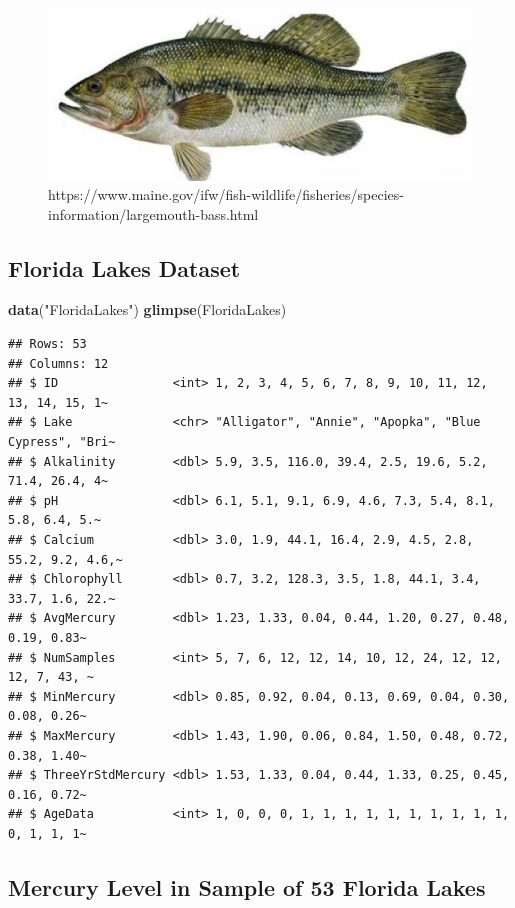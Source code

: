 \documentclass[]{book}
\newenvironment{Shaded}{\begin{snugshade}}{\end{snugshade}}
\newcommand{\KeywordTok}[1]{\textcolor[rgb]{0.13,0.29,0.53}{\textbf{#1}}}
\newcommand{\StringTok}[1]{\textcolor[rgb]{0.31,0.60,0.02}{#1}}
\newcommand{\NormalTok}[1]{#1}
\begin{document}
\begin{figure}
\includegraphics[width=0.5\linewidth]{Bass} \caption{https://www.maine.gov/ifw/fish-wildlife/fisheries/species-information/largemouth-bass.html}\label{fig:Bass}
\end{figure}

\subsection{Florida Lakes Dataset}\label{florida-lakes-dataset}

\begin{Shaded}
\begin{Highlighting}[]
\KeywordTok{data}\NormalTok{(}\StringTok{"FloridaLakes"}\NormalTok{)}
\KeywordTok{glimpse}\NormalTok{(FloridaLakes)}
\end{Highlighting}
\end{Shaded}

\begin{verbatim}
## Rows: 53
## Columns: 12
## $ ID                <int> 1, 2, 3, 4, 5, 6, 7, 8, 9, 10, 11, 12, 13, 14, 15, 1~
## $ Lake              <chr> "Alligator", "Annie", "Apopka", "Blue Cypress", "Bri~
## $ Alkalinity        <dbl> 5.9, 3.5, 116.0, 39.4, 2.5, 19.6, 5.2, 71.4, 26.4, 4~
## $ pH                <dbl> 6.1, 5.1, 9.1, 6.9, 4.6, 7.3, 5.4, 8.1, 5.8, 6.4, 5.~
## $ Calcium           <dbl> 3.0, 1.9, 44.1, 16.4, 2.9, 4.5, 2.8, 55.2, 9.2, 4.6,~
## $ Chlorophyll       <dbl> 0.7, 3.2, 128.3, 3.5, 1.8, 44.1, 3.4, 33.7, 1.6, 22.~
## $ AvgMercury        <dbl> 1.23, 1.33, 0.04, 0.44, 1.20, 0.27, 0.48, 0.19, 0.83~
## $ NumSamples        <int> 5, 7, 6, 12, 12, 14, 10, 12, 24, 12, 12, 12, 7, 43, ~
## $ MinMercury        <dbl> 0.85, 0.92, 0.04, 0.13, 0.69, 0.04, 0.30, 0.08, 0.26~
## $ MaxMercury        <dbl> 1.43, 1.90, 0.06, 0.84, 1.50, 0.48, 0.72, 0.38, 1.40~
## $ ThreeYrStdMercury <dbl> 1.53, 1.33, 0.04, 0.44, 1.33, 0.25, 0.45, 0.16, 0.72~
## $ AgeData           <int> 1, 0, 0, 0, 1, 1, 1, 1, 1, 1, 1, 1, 1, 1, 0, 1, 1, 1~
\end{verbatim}

\subsection{Mercury Level in Sample of 53 Florida
Lakes}\label{mercury-level-in-sample-of-53-florida-lakes}
\end{document}
